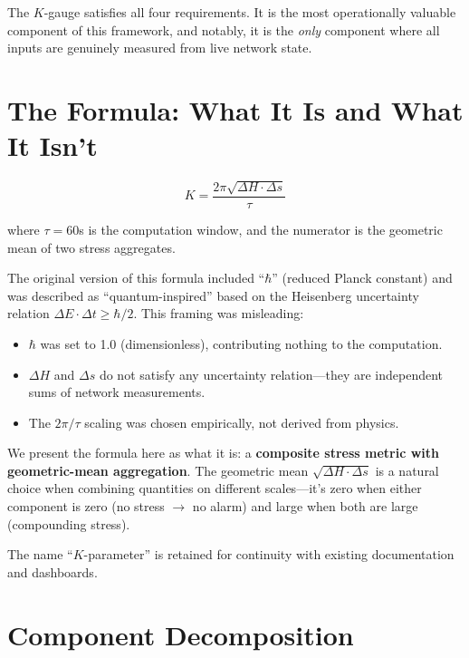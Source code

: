 \documentclass[11pt,a4paper]{article}
\begin{document}
The $K$-gauge satisfies all four requirements. It is the most operationally valuable component of this framework, and notably, it is the \emph{only} component where all inputs are genuinely measured from live network state.

\section{The Formula: What It Is and What It Isn't}

\begin{equation}
\boxed{K = \frac{2\pi\sqrt{\Delta H \cdot \Delta s}}{\tau}}
\label{eq:kgauge}
\end{equation}

where $\tau = 60$s is the computation window, and the numerator is the geometric mean of two stress aggregates.

\begin{honesty}
The original version of this formula included ``$\hbar$'' (reduced Planck constant) and was described as ``quantum-inspired'' based on the Heisenberg uncertainty relation $\Delta E \cdot \Delta t \geq \hbar/2$. This framing was misleading:

\begin{itemize}[nosep]
    \item $\hbar$ was set to 1.0 (dimensionless), contributing nothing to the computation.
    \item $\Delta H$ and $\Delta s$ do not satisfy any uncertainty relation---they are independent sums of network measurements.
    \item The $2\pi/\tau$ scaling was chosen empirically, not derived from physics.
\end{itemize}

We present the formula here as what it is: a \textbf{composite stress metric with geometric-mean aggregation}. The geometric mean $\sqrt{\Delta H \cdot \Delta s}$ is a natural choice when combining quantities on different scales---it's zero when either component is zero (no stress $\to$ no alarm) and large when both are large (compounding stress).

The name ``$K$-parameter'' is retained for continuity with existing documentation and dashboards.
\end{honesty}

\section{Component Decomposition}
\end{document}
